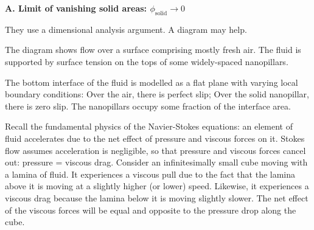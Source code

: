 \documentclass{article}
\begin{document}
 \textbf{A. Limit of vanishing solid areas: $\phi_{\mathrm{solid}} \rightarrow 0 $ }

They use a dimensional analysis argument.  A diagram may help.
\vspace{1em}


\vspace{1em}
The diagram shows flow over a surface comprising mostly fresh air.  The fluid is supported by surface tension on the tops of some widely-spaced nanopillars.

The bottom interface of the fluid is modelled as a flat plane with varying local boundary conditions:  Over the air, there is perfect slip;  Over the solid nanopillar, there is zero slip.  The nanopillars occupy some fraction \phisol  of the interface area.

Recall the fundamental physics of the Navier-Stokes equations: an element of fluid accelerates due to the net effect of pressure and viscous forces on it.  Stokes flow assumes acceleration is negligible, so that pressure and viscous forces cancel out: pressure = viscous drag.  Consider an infinitesimally small cube moving with a lamina of fluid. It experiences a viscous pull due to the fact that the lamina above it is moving at a slightly higher (or lower) speed.  Likewise, it experiences a viscous drag because the lamina below it is moving slightly slower.  The net effect of the viscous forces will be equal and opposite to the pressure drop along the cube.
\end{document}
